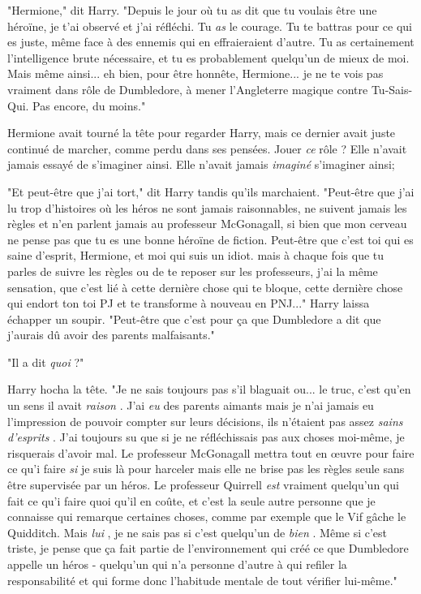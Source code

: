 "Hermione," dit Harry. "Depuis le jour où tu as dit que tu voulais être une héroïne, je t'ai observé et j'ai réfléchi. Tu \emph{as}  le courage. Tu te battras pour ce qui es juste, même face à des ennemis qui en effraieraient d'autre. Tu as certainement l'intelligence brute nécessaire, et tu es probablement quelqu'un de mieux de moi. Mais même ainsi... eh bien, pour être honnête, Hermione... je ne te vois pas vraiment dans rôle de Dumbledore, à mener l'Angleterre magique contre Tu-Sais-Qui. Pas encore, du moins."

Hermione avait tourné la tête pour regarder Harry, mais ce dernier avait juste continué de marcher, comme perdu dans ses pensées. Jouer \emph{ce}  rôle ? Elle n'avait jamais essayé de s'imaginer ainsi. Elle n'avait jamais \emph{imaginé}  s'imaginer ainsi;

"Et peut-être que j'ai tort," dit Harry tandis qu'ils marchaient. "Peut-être que j'ai lu trop d'histoires où les héros ne sont jamais raisonnables, ne suivent jamais les règles et n'en parlent jamais au professeur McGonagall, si bien que mon cerveau ne pense pas que tu es une bonne héroïne de fiction. Peut-être que c'est toi qui es saine d'esprit, Hermione, et moi qui suis un idiot. mais à chaque fois que tu parles de suivre les règles ou de te reposer sur les professeurs, j'ai la même sensation, que c'est lié à cette dernière chose qui te bloque, cette dernière chose qui endort ton toi PJ et te transforme à nouveau en PNJ..." Harry laissa échapper un soupir. "Peut-être que c'est pour ça que Dumbledore a dit que j'aurais dû avoir des parents malfaisants."

"Il a dit \emph{quoi}  ?"

Harry hocha la tête. "Je ne sais toujours pas s'il blaguait ou... le truc, c'est qu'en un sens il avait \emph{raison} . J'ai \emph{eu}  des parents aimants mais je n'ai jamais eu l'impression de pouvoir compter sur leurs décisions, ils n'étaient pas assez \emph{sains d'esprits} . J'ai toujours su que si je ne réfléchissais pas aux choses moi-même, je risquerais d'avoir mal. Le professeur McGonagall mettra tout en œuvre pour faire ce qu'i faire \emph{si}  je suis là pour harceler mais elle ne brise pas les règles seule sans être supervisée par un héros. Le professeur Quirrell \emph{est}  vraiment quelqu'un qui fait ce qu'i faire quoi qu'il en coûte, et c'est la seule autre personne que je connaisse qui remarque certaines choses, comme par exemple que le Vif gâche le Quidditch. Mais \emph{lui} , je ne sais pas si c'est quelqu'un de \emph{bien} . Même si c'est triste, je pense que ça fait partie de l'environnement qui créé ce que Dumbledore appelle un héros - quelqu'un qui n'a personne d'autre à qui refiler la responsabilité et qui forme donc l'habitude mentale de tout vérifier lui-même."

